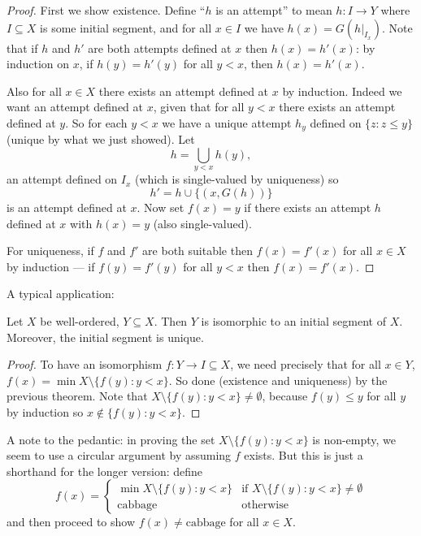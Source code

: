 \documentclass[a4paper]{article}
\begin{document}
\begin{proof}
  First we show existence. Define ``\(h\) is an attempt'' to mean \(h: I \to Y\) where \(I \subseteq X\) is some initial segment, and for all \(x \in I\) we have \(h(x) = G(h|_{I_x})\). Note that if \(h\) and \(h'\) are both attempts defined at \(x\) then \(h(x) = h'(x)\): by induction on \(x\), if \(h(y) = h'(y)\) for all \(y < x\), then \(h(x) = h'(x)\).

  Also for all \(x \in X\) there exists an attempt defined at \(x\) by induction. Indeed we want an attempt defined at \(x\), given that for all \(y < x\) there exists an attempt defined at \(y\). So for each \(y < x\) we have a unique attempt \(h_y\) defined on \(\{z: z\leq y\}\) (unique by what we just showed). Let
  \[
    h = \bigcup_{y < x} h(y),
  \]
  an attempt defined on \(I_x\) (which is single-valued by uniqueness) so
  \[
    h' = h \cup \{(x, G(h))\}
  \]
  is an attempt defined at \(x\). Now set \(f(x) = y\) if there exists an attempt \(h\) defined at \(x\) with \(h(x) = y\) (also single-valued).

  For uniqueness, if \(f\) and \(f'\) are both suitable then \(f(x) = f'(x)\) for all \(x \in X\) by induction --- if \(f(y) = f'(y)\) for all \(y < x\) then \(f(x) = f'(x)\).
\end{proof}

A typical application:

\begin{proposition}
  Let \(X\) be well-ordered, \(Y \subseteq X\). Then \(Y\) is isomorphic to an initial segment of \(X\). Moreover, the initial segment is unique.
\end{proposition}

\begin{proof}
  To have an isomorphism \(f: Y \to I \subseteq X\), we need precisely that for all \(x \in Y\), \(f(x) = \min X \setminus \{f(y): y < x\}\). So done (existence and uniqueness) by the previous theorem. Note that \(X \setminus \{f(y): y < x\} \neq \emptyset\), because \(f(y) \leq y\) for all \(y\) by induction so \(x \notin \{f(y): y < x\}\).
\end{proof}

A note to the pedantic: in proving the set \(X \setminus \{f(y): y < x\}\) is non-empty, we seem to use a circular argument by assuming \(f\) exists. But this is just a shorthand for the longer version: define
\[
  f(x) =
  \begin{cases}
    \min X \setminus \{f(y): y < x\} & \text{if } X \setminus \{f(y): y < x\} \neq \emptyset \\
    \text{cabbage} & \text{otherwise}
  \end{cases}
\]
and then proceed to show \(f(x) \neq \text{cabbage}\) for all \(x \in X\).
\end{document}
